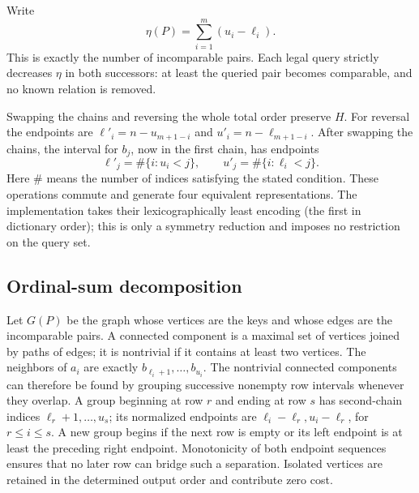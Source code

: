 \documentclass[11pt]{article}
\theoremstyle{definition}
\theoremstyle{remark}
\begin{document}
Write
\begin{equation}\label{ex:area}
             \eta(P)=\sum_{i=1}^m(u_i-\ell_i).
\end{equation}
This is exactly the number of incomparable pairs.  Each legal query strictly
decreases $\eta$ in both successors: at least the queried pair becomes comparable,
and no known relation is removed.

Swapping the chains and reversing the whole total order preserve $H$.
For reversal the endpoints are
$\ell'_i=n-u_{m+1-i}$ and $u'_i=n-\ell_{m+1-i}$.
After swapping the chains, the interval for $b_j$, now in the first chain,
has endpoints
\begin{equation}\label{ex:transpose}
 \ell'_j=\#\{i:u_i<j\},\qquad u'_j=\#\{i:\ell_i<j\}.
\end{equation}
Here $\#$ means the number of indices satisfying the stated condition.
These operations commute and generate four equivalent representations.
The implementation takes their lexicographically least encoding (the first in dictionary order); this is
only a symmetry reduction and imposes no restriction on the query set.

\subsection{Ordinal-sum decomposition}

Let $G(P)$ be the graph whose vertices are the keys and whose edges are the
incomparable pairs. A connected component is a maximal set of vertices joined
by paths of edges; it is nontrivial if it contains at least two vertices.  The neighbors of $a_i$ are exactly
$b_{\ell_i+1},\ldots,b_{u_i}$.  The nontrivial connected components can therefore
be found by grouping successive nonempty row intervals whenever they overlap.
A group beginning at row $r$ and ending at row $s$ has second-chain indices
$\ell_r+1,\ldots,u_s$; its normalized endpoints are
$\ell_i-\ell_r,u_i-\ell_r$, for $r\le i\le s$.
A new group begins if the next row is empty or its left endpoint is at least
the preceding right endpoint.  Monotonicity of both endpoint sequences
ensures that no later row can bridge such a separation.  Isolated vertices
are retained in the determined output order and contribute zero cost.
\end{document}
